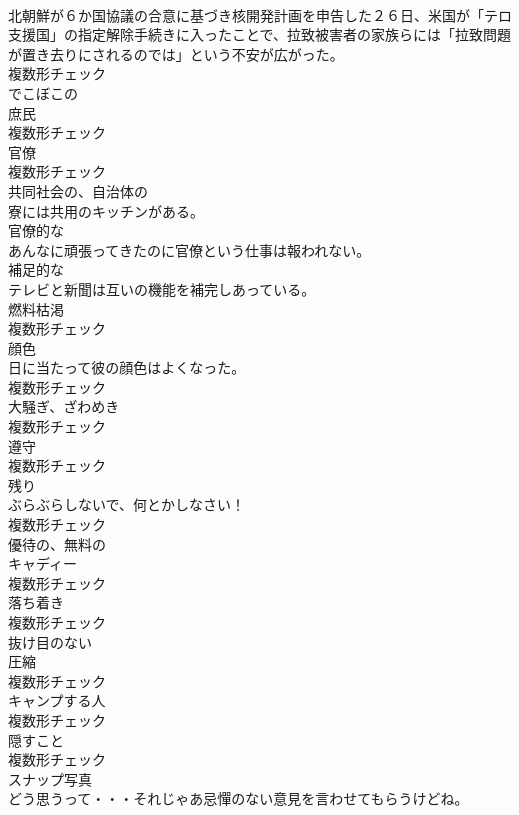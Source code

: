 \documentclass[8pt]{extreport}
\begin{document}
\begin{CJK}{UTF8}{min}
\\	北朝鮮が６か国協議の合意に基づき核開発計画を申告した２６日、米国が「テロ支援国」の指定解除手続きに入ったことで、拉致被害者の家族らには「拉致問題が置き去りにされるのでは」という不安が広がった。	
\\	複数形チェック
\\	[形容詞]	でこぼこの	
\\	[名詞]	庶⺠	
\\	複数形チェック
\\	[名詞]	官僚	
\\	複数形チェック
\\	[形容詞]	共同社会の、自治体の	
\\	寮には共用のキッチンがある。	
\\	[形容詞]	官僚的な	
\\	あんなに頑張ってきたのに官僚という仕事は報われない。	
\\	[形容詞]	補足的な	
\\	テレビと新聞は互いの機能を補完しあっている。	
\\	[名詞]	燃料枯渇	
\\	複数形チェック
\\	[名詞]	顔色	
\\	日に当たって彼の顔色はよくなった。	
\\	複数形チェック
\\	[名詞]	大騒ぎ、ざわめき	
\\	複数形チェック
\\	[名詞]	遵守	
\\	複数形チェック
\\	[名詞]	残り	
\\	ぶらぶらしないで、何とかしなさい！	
\\	複数形チェック
\\	[形容詞]	優待の、無料の	
\\	[名詞]	キャディー	
\\	複数形チェック
\\	[名詞]	落ち着き	
\\	複数形チェック
\\	[形容詞]	抜け目のない	
\\	[名詞]	圧縮	
\\	複数形チェック
\\	[名詞]	キャンプする人	
\\	複数形チェック
\\	[名詞]	隠すこと	
\\	複数形チェック
\\	[名詞]	スナップ写真	
\\	どう思うって・・・それじゃあ忌憚のない意見を言わせてもらうけどね。	

\end{CJK}
\end{document}
